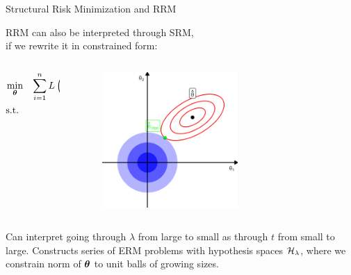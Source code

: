 \documentclass[11pt,compress,t,notes=noshow, xcolor=table]{beamer}
\begin{document}
\begin{frame} {Structural Risk Minimization and RRM}

RRM can also be interpreted through SRM, \\
if we rewrite it in constrained form:

\begin{columns}
\begin{column}{0.5\textwidth}
\begin{eqnarray*}
\min_{\bm{\theta}} && \sum\limits_{i=1}^n L\left(y^{(i)}, f\left(\mathbf{x}^{(i)} ~|~ \bm{\theta}\right)\right)  \\
  \text{s.t. } && \|\bm{\theta}\|_2^2  \leq t \\
\end{eqnarray*}
\end{column}
\begin{column}{0.5\textwidth}
\begin{figure}
\includegraphics[width=0.6\textwidth]{figure/ridge_perspectives_04.png}
\end{figure}
\end{column}
\end{columns}

\vspace{0.5cm}

Can interpret going through $\lambda$ from large to small as through $t$ from small to large.
Constructs series of ERM problems with hypothesis spaces $\mathcal{H}_\lambda$, 
where we constrain norm of $\bm{\theta}$ to unit balls of growing sizes.
\end{frame}


\endlecture
\end{document}
